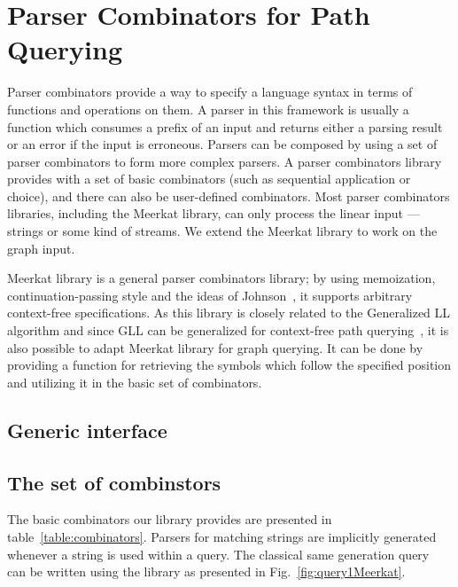  \section{Parser Combinators for Path Querying}

Parser combinators provide a way to specify a language syntax in terms of functions and operations on them. 
A parser in this framework is usually a function which consumes a prefix of an input and returns either a parsing result or an error if the input is erroneous. 
Parsers can be composed by using a set of parser combinators to form more complex parsers. 
A parser combinators library provides with a set of basic combinators (such as sequential application or choice), and there can also be user-defined combinators. 
Most parser combinators libraries, including the Meerkat library, can only process the linear input --- strings or some kind of streams. 
We extend the Meerkat library to work on the graph input.

Meerkat library is a general parser combinators library; by using memoization, continuation-passing style and the ideas of Johnson~\cite{Johnson}, it supports arbitrary context-free specifications. 
As this library is closely related to the Generalized LL algorithm and since GLL can be generalized for context-free path querying~\cite{GrigorevR16}, it is also possible to adapt Meerkat library for graph querying. 
It can be done by providing a function for retrieving the symbols which follow the specified position and utilizing it in the basic set of combinators.

\subsection{Generic interface}
                             
\subsection{The set of combinstors}

The basic combinators our library provides are presented in table~\ref{table:combinators}. 
Parsers for matching strings are implicitly generated whenever a string is used within a query. 
The classical same generation query~\cite{FndDB} can be written using the library as presented in Fig.~\ref{fig:query1Meerkat}.


